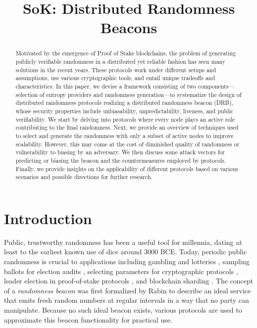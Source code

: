 \documentclass[conference]{IEEEtran}
\title{SoK: Distributed Randomness Beacons}
\theoremstyle{definition}
\theoremstyle{remark}
\begin{document}
\maketitle
\thispagestyle{plain}
\pagestyle{plain}
\begin{abstract}
    Motivated by the emergence of Proof of Stake blockchains, the problem of generating publicly verifiable randomness in a distributed yet reliable fashion has seen many solutions in the recent years. These protocols work under different setups and assumptions, use various cryptographic tools, and entail unique tradeoffs and characteristics. In this paper, we devise a framework consisting of two components---selection of entropy providers and randomness generation---to systematize the design of distributed randomness protocols realizing a distributed randomness beacon (DRB), whose security properties include unbiasability, unpredictability, liveness, and public verifiability. We start by delving into protocols where every node plays an active role contributing to the final randomness. Next, we provide an overview of techniques used to select and generate the randomness with only a subset of active nodes to improve scalability. However, this may come at the cost of diminished quality of randomness or vulnerability to biasing by an adversary. We then discuss some attack vectors for predicting or biasing the beacon and the countermeasures employed by protocols. Finally, we provide insights on the applicability of different protocols based on various scenarios and possible directions for further research.
\end{abstract}

\section{Introduction}
Public, trustworthy randomness has been a useful tool for millennia, dating at least to the earliest known use of dice around 3000 BCE. Today, periodic public randomness is crucial to applications including gambling and lotteries \cite{bonneau2015bitcoin}, sampling ballots for election audits \cite{adida2008helios}, selecting parameters for cryptographic protocols \cite{baigneres2015trap, lenstra2015random}, leader election in proof-of-stake protocols \cite{gilad2017algorand, kiayias2017ouroboros}, and blockchain sharding \cite{al2017chainspace, kokoris2018omniledger}. The concept of a \emph{randomness beacon} was first formalized by Rabin \cite{rabin1983Rabin} to describe an ideal service that emits fresh random numbers at regular intervals in a way that no party can manipulate. Because no such ideal beacon exists, various protocols are used to approximate this beacon functionality for practical use.
\end{document}
